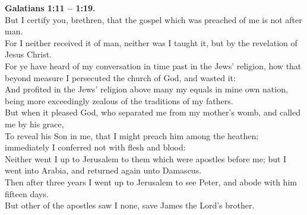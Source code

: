 \documentclass[10pt]{article} %
\begin{document}
{\begin{minipage}[t]{0.45\textwidth}
\textbf{Galatians 1:11 -- 1:19.}\\
But I certify you, brethren, that the gospel which was preached of me is not after man.\\
For I neither received it of man, neither was I taught it, but by the revelation of Jesus Christ.\\
For ye have heard of my conversation in time past in the Jews' religion, how that beyond measure I persecuted the church of God, and wasted it:\\
And profited in the Jews' religion above many my equals in mine own nation, being more exceedingly zealous of the traditions of my fathers.\\
But when it pleased God, who separated me from my mother's womb, and called me by his grace,\\
To reveal his Son in me, that I might preach him among the heathen; immediately I conferred not with flesh and blood:\\
Neither went I up to Jerusalem to them which were apostles before me; but I went into Arabia, and returned again unto Damascus.\\
Then after three years I went up to Jerusalem to see Peter, and abode with him fifteen days.\\
But other of the apostles saw I none, save James the Lord's brother.\\
\end{minipage}}
\newpage\huge
\onehalfspacing
{}
\end{document}
